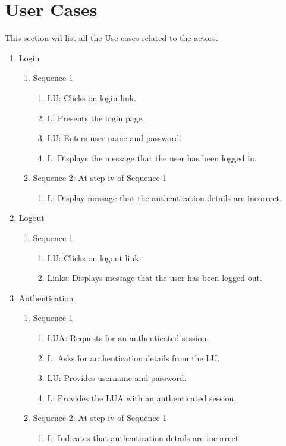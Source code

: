 \documentclass[11pt]{report} %
\begin{document}
\section*{User Cases}
This section wil list all the Use cases related to the actors.
\begin{enumerate}

\item
	Login
		\begin{enumerate}
			\item
				Sequence 1
					\begin{enumerate}
						\item
							LU: Clicks on login link.
						\item
							L: Presents the login page.
						\item
							LU: Enters user name and password.
						\item
							L: Displays the message that the user has been logged in.
					\end{enumerate}
			\item
				Sequence 2: At step iv of Sequence 1
					\begin{enumerate}
						\item
							L: Display message that the authentication details are incorrect.						
					\end{enumerate}
		\end{enumerate}

\item
	Logout
		\begin{enumerate}
			\item
				Sequence 1
					\begin{enumerate}
						\item
							LU: Clicks on logout link.
						\item
							Links: Displays message that the user has been logged out.			
					\end{enumerate}
		\end{enumerate}

\item
	Authentication
		\begin{enumerate}
			\item
				Sequence 1
					\begin{enumerate}
						\item
							LUA: Requests for an authenticated session.
						\item
							L: Asks for authentication details from the LU.
						\item
							LU: Provides username and password.
						\item
							L: Provides the LUA with an authenticated session.
					\end{enumerate}
			\item
				Sequence 2: At step iv of Sequence 1
					\begin{enumerate}
						\item
							L: Indicates that authentication details are incorrect					
					\end{enumerate}
		\end{enumerate}


\end{enumerate}
\end{document}
